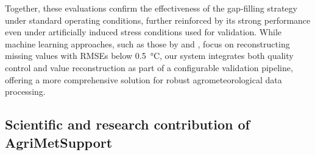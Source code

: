 \documentclass[authoryear,preprint,review,12pt]{elsarticle}
\newcommand{\statusblock}[3]{
    \ifthenelse{\equal{#2}{todo}}
        {\textcolor{red}{#1 (TO DO): #3}}
        {}
    \ifthenelse{\equal{#2}{wip}}
        {\textcolor{magenta}{#1 (IN PROGRESS): #3}}
        {}
    \ifthenelse{\equal{#2}{update}}
        {\textcolor{blue}{#1 (UPDATE): #3}}
        {}
    \ifthenelse{\equal{#2}{review}}
        {\textcolor{cyan}{#1 (REVIEW): #3}}
        {}
    \ifthenelse{\equal{#2}{done}}
        {\textcolor{PineGreen}{#1 (READY): #3}}
        {}
}
\begin{document}
Together, these evaluations confirm the effectiveness of the gap-filling strategy under standard operating conditions, further reinforced by its strong performance even under artificially induced stress conditions used for validation.
While machine learning approaches, such as those by \citet{gap-filling-lalic2024} and \citet{gap-filling-xie2021}, focus on reconstructing missing values with RMSEs below \SI{0.5}{\degreeCelsius}, our system integrates both quality control and value reconstruction as part of a configurable validation pipeline, offering a more comprehensive solution for robust agrometeorological data processing.%

\subsection{Scientific and research contribution of Agri\-Met\-Support}\label{sec:Valuability}
    
\end{document}
